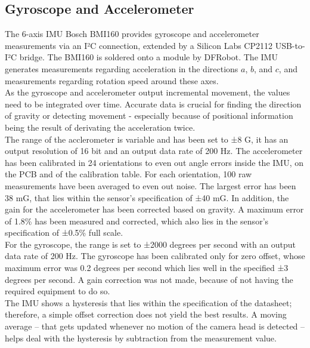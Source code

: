 \subsection{Gyroscope and Accelerometer}
\label{sec:GyroCal}
The 6-axis IMU Bosch BMI160 provides gyroscope and accelerometer measurements via an I²C connection, extended by a Silicon Labs CP2112 USB-to-I²C bridge. The BMI160 is soldered onto a module by DFRobot. The IMU generates measurements regarding acceleration in the directions $a$, $b$, and $c$, and measurements regarding rotation speed around these axes.\\
As the gyroscope and accelerometer output incremental movement, the values need to be integrated over time. Accurate data is crucial for finding the direction of gravity or detecting movement - especially because of positional information being the result of derivating the acceleration twice.\\
The range of the acclerometer is variable and has been set to ±8 G, it has an output resolution of 16 bit and an output data rate of 200 Hz.
The accelerometer has been calibrated in 24 orientations to even out angle errors inside the IMU, on the PCB and of the calibration table. For each orientation, 100 raw measurements have been averaged to even out noise. 
The largest error has been 38 mG, that lies within the sensor's specification of ±40 mG\cite{BMI160}. In addition, the gain for the accelerometer has been corrected based on gravity. A maximum error of 1.8\% has been measured and corrected, which also lies in the sensor's specification of ±0.5\% full scale\cite{BMI160}.\\
For the gyroscope, the range is set to ±2000 degrees per second with an output data rate of 200 Hz. The gyroscope has been calibrated only for zero offset, whose maximum error was 0.2 degrees per second which lies well in the specified ±3 degrees per second\cite{BMI160}. A gain correction was not made, because of not having the required equipment to do so.\\
The IMU shows a hysteresis that lies within the specification of the datasheet; therefore, a simple offset correction does not yield the best results. A moving average – that gets updated whenever no motion of the camera head is detected – helps deal with the hysteresis by subtraction from the measurement value.

